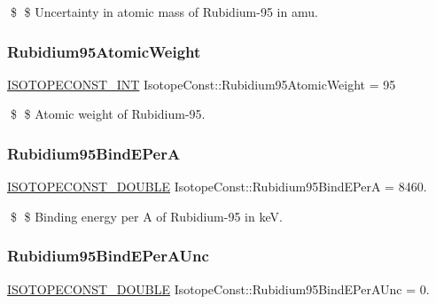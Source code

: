 \$ \$ Uncertainty in atomic mass of Rubidium-\/95 in amu. \mbox{\label{group___isotope_const-_rubidium-_rb95_ga13a4e81438dfa419676801e1a81efc32}} 
\subsubsection{\texorpdfstring{Rubidium95\+Atomic\+Weight}{Rubidium95AtomicWeight}}
{\footnotesize\ttfamily \mbox{\hyperlink{group___isotope_const-_macros_ga5f18360b3e99483a35c32d789e62621c}{I\+S\+O\+T\+O\+P\+E\+C\+O\+N\+S\+T\+\_\+\+I\+NT}} Isotope\+Const\+::\+Rubidium95\+Atomic\+Weight = 95}

\$ \$ Atomic weight of Rubidium-\/95. \mbox{\label{group___isotope_const-_rubidium-_rb95_ga32596d325d6419851a57f6ea19570654}} 
\subsubsection{\texorpdfstring{Rubidium95\+Bind\+E\+PerA}{Rubidium95BindEPerA}}
{\footnotesize\ttfamily \mbox{\hyperlink{group___isotope_const-_macros_ga8f45a7272ce02c0b4c65c44636ed719a}{I\+S\+O\+T\+O\+P\+E\+C\+O\+N\+S\+T\+\_\+\+D\+O\+U\+B\+LE}} Isotope\+Const\+::\+Rubidium95\+Bind\+E\+PerA = 8460.}

\$ \$ Binding energy per A of Rubidium-\/95 in keV. \mbox{\label{group___isotope_const-_rubidium-_rb95_gae4656afc4d9fa8caacfdecb71e8900fe}} 
\subsubsection{\texorpdfstring{Rubidium95\+Bind\+E\+Per\+A\+Unc}{Rubidium95BindEPerAUnc}}
{\footnotesize\ttfamily \mbox{\hyperlink{group___isotope_const-_macros_ga8f45a7272ce02c0b4c65c44636ed719a}{I\+S\+O\+T\+O\+P\+E\+C\+O\+N\+S\+T\+\_\+\+D\+O\+U\+B\+LE}} Isotope\+Const\+::\+Rubidium95\+Bind\+E\+Per\+A\+Unc = 0.}

